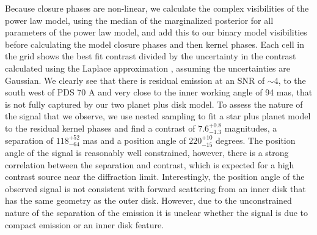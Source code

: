 \documentclass[11pt,twocolumn,twocolappendix]{aastex631}
\begin{document}
{Because closure phases are non-linear, we calculate the complex visibilities of the {power law model}, using the median of the marginalized posterior for all parameters of {the power law model, } %
and add this to our binary model visibilities before calculating the model closure phases {and then kernel phases}. Each cell in the grid shows the best fit contrast divided by the uncertainty in the contrast calculated using the Laplace approximation \citep{doi:10.1080/01621459.1986.10478240}, assuming the uncertainties are Gaussian. We clearly see that there is residual emission at an SNR of $\sim$4, to the south west of PDS 70 A and very close to the inner working angle of 94 mas, that is not fully captured by our two planet plus disk model. To assess the nature of the signal that we observe, we use nested sampling to fit a star plus planet model to the residual {kernel phases and find a contrast of $7.6^{+0.8}_{-1.3}$ magnitudes, a separation of $118^{+52}_{-64}$ mas and a position angle of $220^{+10}_{-15}$ degrees}. The position angle of the signal is {reasonably well constrained, however, there is a strong correlation} between the separation and contrast, which is expected for a high contrast source near the diffraction limit. Interestingly, the position angle of the observed signal is not consistent with forward scattering from an inner disk that has the same geometry as the outer disk. However, due to the unconstrained nature of the separation of the emission it is unclear whether the signal is due to compact emission or an inner disk feature.}
\end{document}
